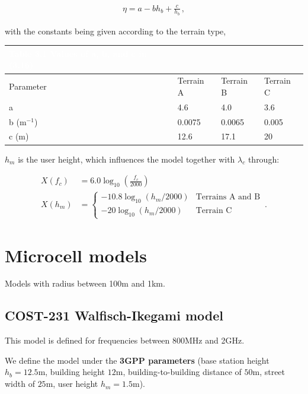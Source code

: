 \documentclass[a4paper, 12pt]{book}
\begin{document}
\begin{align}
\eta = a - b h_b + \frac{c}{h_b} \,, \tag{3.16}
\end{align}

with the constants being given according to the terrain type,

\begin{center}
\renewcommand{\arraystretch}{1.2}
\begin{tabular}{llll}
\toprule
\rowcolor{gray!50} \textbf{\textcolor{white}{Table 3.1} \textcolor{white}{Values of a, b, and c in (3.16)}} & & & \\
\midrule
\rowcolor{gray!20} Parameter & Terrain A & Terrain B & Terrain C \\
a & 4.6 & 4.0 & 3.6 \\
b (m$^{-1}$) & 0.0075 & 0.0065 & 0.005 \\
c (m) & 12.6 & 17.1 & 20 \\
\bottomrule
\end{tabular}
\end{center}

$h_m$ is the user height, which influences the model together with $\lambda_c$ through:

\begin{align}
X(f_c) &= 6.0 \log_{10} \left( \frac{f_c}{2000} \right) \tag{3.17} \\
X(h_m) &= \begin{cases}
-10.8 \log_{10}(h_m/2000) & \text{Terrains A and B} \\
-20 \log_{10}(h_m/2000) & \text{Terrain C}
\end{cases} \,. \tag{3.18}
\end{align}

\section{Microcell models}

Models with radius between 100m and 1km.

\subsection{COST-231 Walfisch-Ikegami model}

This model is defined for frequencies between 800MHz and 2GHz.

We define the model under the \textbf{3GPP parameters} (base station height $h_b=12.5\text{m}$, building height $12\text{m}$, building-to-building distance of $50\text{m}$, street width of $25\text{m}$, user height $h_m=1.5\text{m}$).
\end{document}
